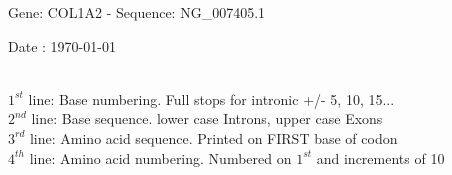 \documentclass{article}
\begin{document}
\renewcommand{\footrulewidth}{1pt}
\renewcommand{\headrulewidth}{0pt}
\begin{center}
\begin{large}
 Gene: COL1A2 - Sequence: NG\_007405.1
 
 Date : \today\\\\
\end{large}
\end{center}
$1^{st}$ line: Base numbering. Full stops for intronic +/- 5, 10, 15...\\
$2^{nd}$ line: Base sequence. lower case Introns, upper case Exons\\
$3^{rd}$ line: Amino acid sequence. Printed on FIRST base of codon\\
$4^{th}$ line: Amino acid numbering. Numbered on $1^{st}$ and increments of 10\\
\end{document}
